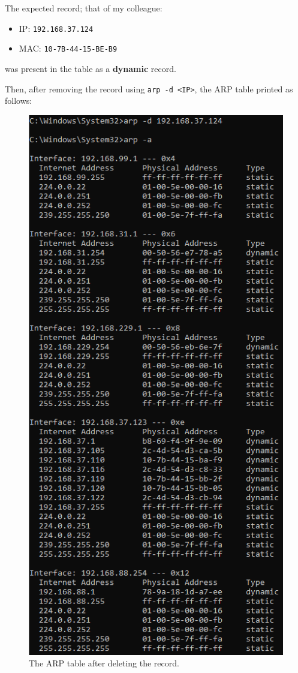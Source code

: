 \documentclass[a4paper,12pt]{article}
\begin{document}
The expected record; that of my colleague:
\begin{itemize}
    \item IP: \texttt{192.168.37.124}
    \item MAC: \texttt{10-7B-44-15-BE-B9}
\end{itemize}
was present in the table as a \textbf{dynamic} record.

Then, after removing the record using \texttt{arp -d <IP>}, the ARP table printed as follows:
\begin{figure}[H]
\centering
\includegraphics[width=\linewidth, height=0.55\textheight,  keepaspectratio]{Pictures_Lab1/arp-a after deletion obj3.png}
\caption{The ARP table after deleting the record.}
\end{figure}
\end{document}
